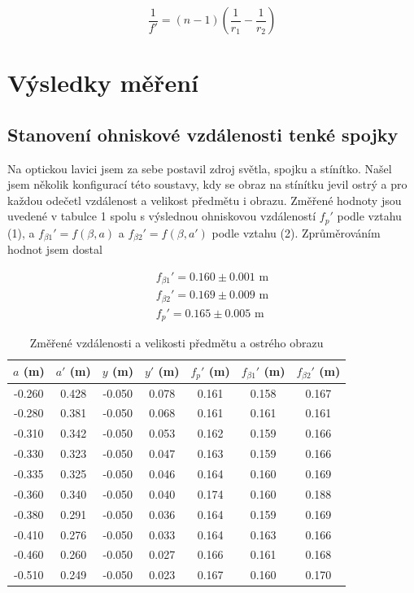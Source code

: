 \documentclass[a4paper,11pt]{article}
\begin{document}
\begin{equation}
\frac{1}{f'} = (n - 1)(\frac{1}{r_1} - \frac{1}{r_2})
\end{equation}

\newpage
\section{Výsledky měření}

\subsection{Stanovení ohniskové vzdálenosti tenké spojky}

Na optickou lavici jsem za sebe postavil zdroj světla, spojku a stínítko. Našel jsem několik konfigurací této soustavy, kdy se obraz na stínítku jevil ostrý a pro každou odečetl vzdálenost a velikost předmětu i obrazu. Změřené hodnoty jsou uvedené v tabulce 1 spolu s výslednou ohniskovou vzdáleností $ f_p' $ podle vztahu (1), a $ f_{\beta 1}' = f(\beta, a) $ a $ f_{\beta 2}' = f(\beta, a') $ podle vztahu (2). Zprůměrováním hodnot jsem dostal

\begin{align*}
f_{\beta 1}' = 0.160 \pm 0.001 \text{ m} \\
f_{\beta 2}' = 0.169 \pm 0.009 \text{ m} \\
f_p' =  0.165 \pm 0.005 \text{ m}
\end{align*}


\begin{table}[htpb]
    \centering
    \begin{tabular}{cccc | ccc}
        $ a $ (m) & $ a' $ (m) & $ y $ (m) & $ y' $ (m) & $ f_p' $ (m) & $ f_{\beta 1}' $ (m) & $ f_{\beta 2}' $ (m)  \\ \hline
        -0.260 & 0.428 & -0.050 & 0.078 & 0.161 & 0.158 & 0.167 \\
        -0.280 & 0.381 & -0.050 & 0.068 & 0.161 & 0.161 & 0.161 \\
        -0.310 & 0.342 & -0.050 & 0.053 & 0.162 & 0.159 & 0.166 \\
        -0.330 & 0.323 & -0.050 & 0.047 & 0.163 & 0.159 & 0.166 \\
        -0.335 & 0.325 & -0.050 & 0.046 & 0.164 & 0.160 & 0.169 \\
        -0.360 & 0.340 & -0.050 & 0.040 & 0.174 & 0.160 & 0.188 \\
        -0.380 & 0.291 & -0.050 & 0.036 & 0.164 & 0.159 & 0.169 \\
        -0.410 & 0.276 & -0.050 & 0.033 & 0.164 & 0.163 & 0.166 \\
        -0.460 & 0.260 & -0.050 & 0.027 & 0.166 & 0.161 & 0.168 \\
        -0.510 & 0.249 & -0.050 & 0.023 & 0.167 & 0.160 & 0.170 \\
    \end{tabular}
    \caption{Změřené vzdálenosti a velikosti předmětu a ostrého obrazu}
\end{table}
\end{document}

